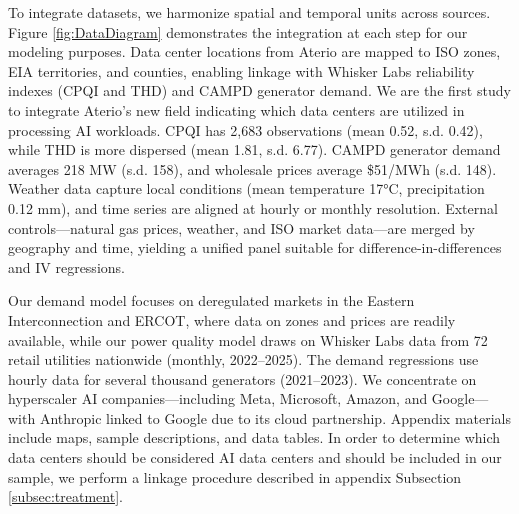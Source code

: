 \documentclass[a4paper,fleqn,longmktitle]{cas-sc}
\theoremstyle{plain}
\theoremstyle{definition}
\begin{document}
To integrate datasets, we harmonize spatial and temporal units across sources. Figure \ref{fig:DataDiagram} demonstrates the integration at each step for our modeling purposes. Data center locations from Aterio are mapped to ISO zones, EIA territories, and counties, enabling linkage with Whisker Labs reliability indexes (CPQI and THD) and CAMPD generator demand. We are the first study to integrate Aterio’s new field indicating which data centers are utilized in processing AI workloads. CPQI has 2,683 observations (mean 0.52, s.d. 0.42), while THD is more dispersed (mean 1.81, s.d. 6.77). CAMPD generator demand averages 218 MW (s.d. 158), and wholesale prices average \$51/MWh (s.d. 148). Weather data capture local conditions (mean temperature 17°C, precipitation 0.12 mm), and time series are aligned at hourly or monthly resolution. External controls—natural gas prices, weather, and ISO market data—are merged by geography and time, yielding a unified panel suitable for difference-in-differences and IV regressions.

Our demand model focuses on deregulated markets in the Eastern Interconnection and ERCOT, where data on zones and prices are readily available, while our power quality model draws on Whisker Labs data from 72 retail utilities nationwide (monthly, 2022–2025). The demand regressions use hourly data for several thousand generators (2021–2023). We concentrate on hyperscaler AI companies—including Meta, Microsoft, Amazon, and Google—with Anthropic linked to Google due to its cloud partnership. Appendix materials include maps, sample descriptions, and data tables. In order to determine which data centers should be considered AI data centers and should be included in our sample, we perform a linkage procedure described in appendix Subsection \ref{subsec:treatment}.
\end{document}

